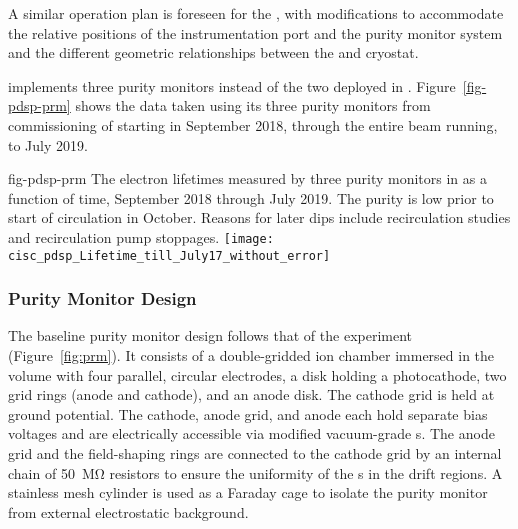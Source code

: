   A similar 
  operation plan is foreseen for %
  the , with modifications to accommodate the relative positions of the instrumentation port %
  and the purity monitor system and the %
  different geometric relationships between the  and cryostat.






 implements three purity monitors instead of the two deployed in .
Figure~\ref{fig-pdsp-prm} shows the  data taken using %
its three purity monitors from commissioning of  starting in September 2018, through the entire beam running, to July 2019.

\begin{dunefigure}{fig-pdsp-prm}
  {The electron lifetimes measured by three purity monitors in  as a function of time, September 2018 through July 2019. The purity is low prior to start of circulation in October. Reasons for later dips include recirculation studies and recirculation pump stoppages.}
  \texttt{[image: cisc\_pdsp\_Lifetime\_till\_July17\_without\_error]}
\end{dunefigure}

\subsubsection{Purity Monitor Design}

The  baseline purity monitor design follows that of  the  experiment (Figure~\ref{fig:prm})\cite{Adamowski:2014daa}.  It consists of a double-gridded ion chamber immersed in the \lar volume with four parallel, circular electrodes, a disk holding a photocathode, two grid rings (anode and cathode), and an anode disk. The cathode grid is held at ground potential. The cathode, anode grid, and anode 
each hold separate bias voltages and are electrically accessible via modified vacuum-grade  \fdth{}s. %
The anode grid and the field-shaping rings are connected to the cathode grid by an internal chain of \SI{50}{\mega\ohm} resistors to ensure the uniformity of the \efield{}s in the drift regions. A stainless mesh cylinder is used as a Faraday cage to isolate the purity monitor from external electrostatic background. 

